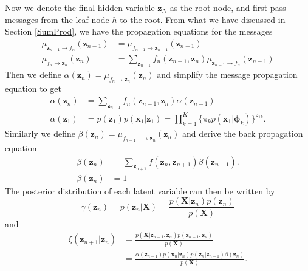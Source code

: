 \documentclass[a4paper]{book}
\renewcommand{\bf}{\mathbf}
\newcommand{\bs}{\boldsymbol}
\begin{document}
Now we denote the final hidden variable $\bf{z}_N$ as the root node, and first pass messages from the leaf node $h$ to the root. From what we have discussed in Section \ref{SumProd}, we have the propagation equations for the messages
\begin{align}
	\mu_{\bf{z}_{n-1}\rightarrow f_n}(\bf{z}_{n-1}) &= \mu_{f_{n-1}\rightarrow \bf{z}_{n-1}}(\bf{z}_{n-1}) \\
	\mu_{f_n \rightarrow \bf{z}_{n}}(\bf{z}_n) &= \sum_{\bf{z}_{n-1}}f_n (\bf{z}_{n-1},\bf{z}_n)\mu_{\bf{z}_{n-1}\rightarrow f_n}(\bf{z}_{n-1})
\end{align}
Then we define $\alpha(\bf{z}_n) = \mu_{f_n \rightarrow \bf{z}_n}(\bf{z}_n)$ and simplify the message propagation equation to get
\begin{align}
	\alpha(\bf{z}_n) &= \sum_{\bf{z}_{n-1}} f_n (\bf{z}_{n-1},\bf{z}_n) \alpha(\bf{z}_{n-1})\\
	\alpha(\bf{z}_1) &= p(\bf{z}_1)p(\bf{x}_1|\bf{z}_1)=\prod_{k=1}^K \{ \pi_k p(\bf{x}_1|\bs{\phi}_k) \}^{z_{1k}}.
\end{align}
Similarly we define $\beta(\bf{z}_n) = \mu_{f_{n+1}-\rightarrow\bf{z}_n}(\bf{z}_n)$ and derive the back propagation equation
\begin{align}
	\beta(\bf{z}_n) &= \sum_{\bf{z}_{n+1}} f(\bf{z}_n,\bf{z}_{n+1}) \beta(\bf{z}_{n+1}). \\
	\beta(\bf{z}_n) &= 1
\end{align}
The posterior distribution of each latent variable can then be written by
\begin{equation}
	\gamma(\bf{z}_n) = p(\bf{z}_n|\bf{X}) = \frac{p(\bf{X}|\bf{z}_n)p(\bf{z}_n)}{p(\bf{X})}
\end{equation}
and
\begin{align}
	\xi(\bf{z}_{n+1}|\bf{z}_n) &= \frac{p(\bf{X}|\bf{z}_{n-1},\bf{z}_n)p(\bf{z}_{n-1},\bf{z}_n)}{p(\bf{X})} \\
	&= \frac{\alpha(\bf{z}_{n-1})p(\bf{x}_n|\bf{z}_n)p(\bf{z}_n|\bf{z}_{n-1})\beta(\bf{z}_n)}{p(\bf{X})}.
\end{align}
\end{document}
